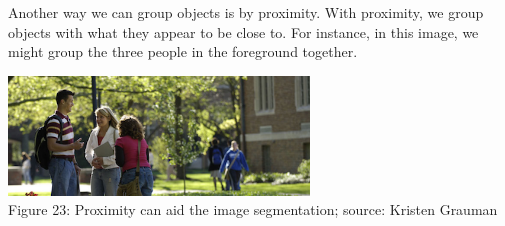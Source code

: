 \documentclass{article}
\begin{document}
Another way we can group objects is by proximity. With proximity, we group objects with what they appear to be close to. For instance, in this image, we might group the three people in the foreground together.
\begin{center}
\includegraphics[width=8cm]{people.png} \\
Figure 23: Proximity can aid the image segmentation; source: Kristen Grauman
\end{center}


\small


\end{document}
